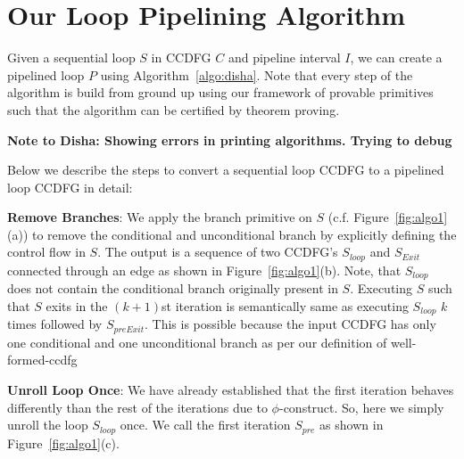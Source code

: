 \section{Our Loop Pipelining Algorithm}
Given a sequential loop $S$ in CCDFG $C$ and pipeline interval $I$, we can create a pipelined loop $P$ using Algorithm~\ref{algo:disha}. Note that every step of the algorithm is build from ground up using our framework of provable primitives such that the algorithm can be certified by theorem proving.

{\bf Note to Disha: Showing errors in printing algorithms. Trying to debug}

%

Below we describe the steps to convert a sequential loop CCDFG to a pipelined loop CCDFG in detail:
 
{\bf Remove Branches}: We apply the branch primitive on $S$ (c.f. Figure~\ref{fig:algo1}(a)) to remove the conditional and unconditional branch by explicitly defining the control flow in $S$. The output is a sequence of two CCDFG's $S_{loop}$ and $S_{Exit}$ connected through an edge as shown in Figure~\ref{fig:algo1}(b).
Note, that $S_{loop}$ does not contain the conditional branch originally present in $S$.
Executing $S$ such that $S$ exits in the $(k+1)$st iteration is semantically same as executing $S_{loop}$ $k$ times
followed by $S_{preExit}$. This is possible because the input CCDFG has only one conditional and one unconditional branch as per our definition of well-formed-ccdfg 

{\bf Unroll Loop Once}: We have already established that the first iteration behaves differently than the rest of the
iterations due to $\phi$-construct. So, here we simply unroll the loop $S_{loop}$ once. We call the first iteration
$S_{pre}$ as shown in Figure~\ref{fig:algo1}(c).

